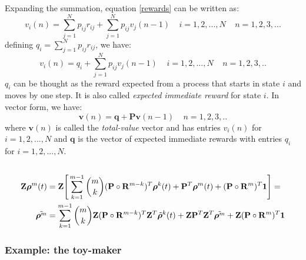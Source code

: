 \documentclass[\main/main.tex]{subfiles}
\begin{document}
\noindent Expanding the summation, equation \ref{rewards} can be written as:
\begin{equation}
   v_i(n) = \sum_{j=1}^N p_{ij}r_{ij} +  \sum_{j=1}^N p_{ij}v_j(n-1) \;\;\;\; i=1,2,...,N \;\;\;\; n=1,2,3,...
\end{equation}
defining $q_i =  \sum_{j=1}^N p_{ij}r_{ij}$, we have:
\begin{equation}
   v_i(n) = q_i +  \sum_{j=1}^N p_{ij}v_j(n-1) \;\;\;\; i=1,2,...,N \;\;\;\; n=1,2,3,..
\end{equation}
$q_i$ can be thought as the reward expected from a process that starts in state $i$ and moves by one step. It is also called \textit{expected immediate reward} for state $i$. 
In vector form, we have:
\begin{equation}
   \mathbf{v}(n) = \mathbf{q} +  \mathbf{P}\mathbf{v}(n-1)\;\;\;\; n=1,2,3,..
\end{equation}
where $ \mathbf{v}(n)$ is called the \textit{total-value} vector and has entries $ v_i(n)$ for $i=1,2,...,N$ and $ \mathbf{q}$ is the vector of expected immediate rewards with entries $q_i$   for $i=1,2,...,N$.



\subsection{}

\begin{equation}\label{mom2}
\begin{split}
     \mathbf{Z}\bm{\rho}^m(t) &= \mathbf{Z} \Bigg[ 
     \sum_{k=1}^{m-1} {m \choose k} (\mathbf{P} \circ \mathbf{R}^{m-k}) ^ T \bm{\rho}^k(t) +
     \mathbf{P} ^ T \bm{\rho}^m(t) + (\mathbf{P} \circ \mathbf{R}^{m}) ^ T \bm{1}\Bigg] = \\
     \Tilde{\bm{\rho}^m} &= \sum_{k=1}^{m-1} {m \choose k}\mathbf{Z}  (\mathbf{P} \circ \mathbf{R}^{m-k}) ^ T\mathbf{Z}^T \Tilde{\bm{\rho}}^k(t) + \mathbf{Z} \mathbf{P}^T \mathbf{Z}^T \Tilde{\bm{\rho}^m}  + \mathbf{Z} (\mathbf{P} \circ \mathbf{R}^{m}) ^ T \bm{1}
\end{split}
    \end{equation}










\subsubsection{Example: the toy-maker \citep{Howard1960}}\label{toy-maker1}
\end{document}
